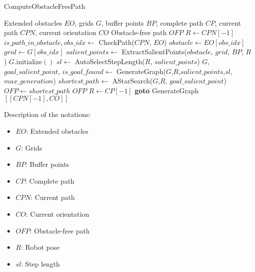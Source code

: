 \begin{algorithm}[H]
    \caption{ComputeObstacleFreePath}
    \label{alg:compute_obstacle_free_path}
    \begin{algorithmic}[1]
    \Require Extended obstacles $EO$, grids $G$, buffer points $BP$, complete path $CP$, current path $CPN$, current orientation $CO$
    \Ensure Obstacle-free path $OFP$
    \State $R \leftarrow CPN[-1]$
    \State $is\_path\_in\_obstacle, obs\_idx \leftarrow$ CheckPath($CPN$, $EO$)
        \State $obstacle \leftarrow EO[obs\_idx]$
        \State $grid \leftarrow G[obs\_idx]$
        \State $salient\_points \leftarrow$ ExtractSalientPoints($obstacle$, $grid$, $BP$, $R$)
        \State $G.\text{initialize}()$
        \State $sl \leftarrow$ AutoSelectStepLength($R$, $salient\_points$)
        \State $G$, $goal\_salient\_point$, $is\_goal\_found \leftarrow$ GenerateGraph($G$,$R$,$salient\_points$,$sl$,$max\_generation$)
            \State $shortest\_path \leftarrow$ AStarSearch($G$,$R$, $goal\_salient\_point$)
            \State $OFP \leftarrow shortest\_path$
            \State \Return $OFP$
        \Else
            \State $R \leftarrow CP[-1]$ 
            \State \textbf{goto} GenerateGraph
        \EndIf
    \Else
        \State \Return $[[CPN[-1], CO]]$
    \EndIf
    \end{algorithmic}
    \end{algorithm}
    
    Description of the notations:
    \begin{itemize}[noitemsep,topsep=0pt]
        \item $EO$: Extended obstacles
        \item $G$: Grids
        \item $BP$: Buffer points
        \item $CP$: Complete path
        \item $CPN$: Current path
        \item $CO$: Current orientation
        \item $OFP$: Obstacle-free path
        \item $R$: Robot pose
        \item $sl$: Step length
    \end{itemize}
    



